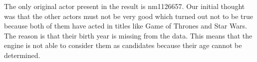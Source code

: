 The only original actor present in the result is nm1126657. Our initial thought was that the other actors must not be very good which turned out not to be true because both of them have acted in titles like Game of Thrones and Star Wars. The reason is that their birth year is missing from the data. This means that the engine is not able to consider them as candidates because their age cannot be determined.